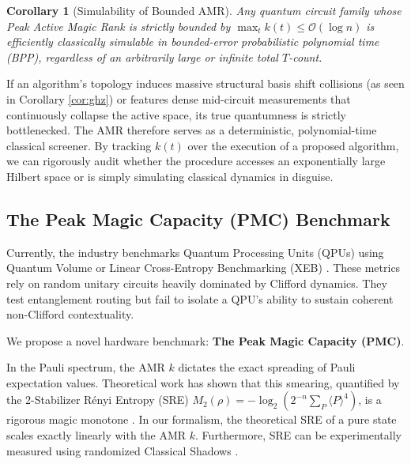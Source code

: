 \documentclass[aps,prx,reprint,superscriptaddress,nofootinbib]{revtex4-2}
\newtheorem{corollary}[theorem]{Corollary}
\theoremstyle{definition}
\begin{document}
\begin{corollary}[Simulability of Bounded AMR]
Any quantum circuit family whose Peak Active Magic Rank is strictly bounded by $\max_t k(t) \le \mathcal{O}(\log n)$ is efficiently classically simulable in bounded-error probabilistic polynomial time (BPP), regardless of an arbitrarily large or infinite total $T$-count.
\end{corollary}

If an algorithm's topology induces massive structural basis shift collisions (as seen in Corollary \ref{cor:ghz}) or features dense mid-circuit measurements that continuously collapse the active space, its true quantumness is strictly bottlenecked. The AMR therefore serves as a deterministic, polynomial-time classical screener. By tracking $k(t)$ over the execution of a proposed algorithm, we can rigorously audit whether the procedure accesses an exponentially large Hilbert space or is simply simulating classical dynamics in disguise.

\subsection{The Peak Magic Capacity (PMC) Benchmark}
Currently, the industry benchmarks Quantum Processing Units (QPUs) using Quantum Volume \cite{cross2019} or Linear Cross-Entropy Benchmarking (XEB) \cite{arute2019}. These metrics rely on random unitary circuits heavily dominated by Clifford dynamics. They test entanglement routing but fail to isolate a QPU's ability to sustain coherent non-Clifford contextuality.

We propose a novel hardware benchmark: \textbf{The Peak Magic Capacity (PMC)}.

In the Pauli spectrum, the AMR $k$ dictates the exact spreading of Pauli expectation values. Theoretical work has shown that this smearing, quantified by the 2-Stabilizer R\'enyi Entropy (SRE) $M_2(\rho) = -\log_2 ( 2^{-n} \sum_{P} \langle P \rangle^4 )$, is a rigorous magic monotone \cite{leone2022}. In our formalism, the theoretical SRE of a pure state scales exactly linearly with the AMR $k$. Furthermore, SRE can be experimentally measured using randomized Classical Shadows \cite{huang2020}.
\end{document}

